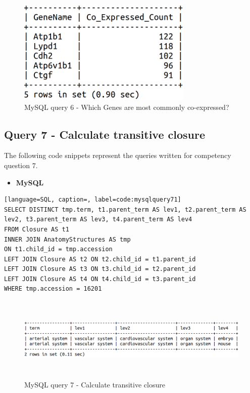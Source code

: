 \begin{figure}[H]\begin{center}\includegraphics[height=5cm,width=0.7\linewidth]{images/mysqlquery6}\caption{MySQL query 6 - Which Genes are most commonly co-expressed?}\label{fig:mysqlquery6}\end{center}\end{figure}

\newpage
\subsection*{Query 7 - Calculate transitive closure}\label{query7}
The following code snippets represent the queries written for competency question 7.

\begin{itemize}[leftmargin=*]
\item \textbf{MySQL}
\end{itemize}

\begin{lstlisting}[language=SQL, caption=, label=code:mysqlquery71]
SELECT DISTINCT tmp.term, t1.parent_term AS lev1, t2.parent_term AS lev2, t3.parent_term AS lev3, t4.parent_term AS lev4
FROM Closure AS t1
INNER JOIN AnatomyStructures AS tmp
ON t1.child_id = tmp.accession
LEFT JOIN Closure AS t2 ON t2.child_id = t1.parent_id
LEFT JOIN Closure AS t3 ON t3.child_id = t2.parent_id
LEFT JOIN Closure AS t4 ON t4.child_id = t3.parent_id
WHERE tmp.accession = 16201
\end{lstlisting}
\begin{figure}[H]\begin{center}\includegraphics[height=4cm,width=1\linewidth]{images/mysqlquery71}\caption{MySQL query 7 - Calculate transitive closure}\label{fig:mysqlquery7}\end{center}\end{figure}

